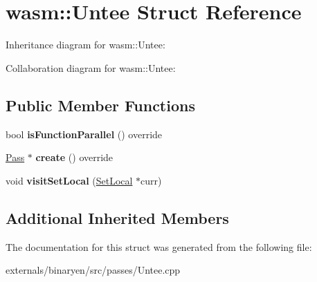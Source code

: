 \hypertarget{structwasm_1_1_untee}{}\section{wasm\+:\+:Untee Struct Reference}
\label{structwasm_1_1_untee}


Inheritance diagram for wasm\+:\+:Untee\+:


Collaboration diagram for wasm\+:\+:Untee\+:
\subsection*{Public Member Functions}
\begin{DoxyCompactItemize}
\item 
\mbox{\label{structwasm_1_1_untee_a543a1c3099eb449c6097090ac2db5d5c}} 
bool {\bfseries is\+Function\+Parallel} () override
\item 
\mbox{\label{structwasm_1_1_untee_ab34619b11a5fff6289cf600784852b22}} 
\mbox{\hyperlink{classwasm_1_1_pass}{Pass}} $\ast$ {\bfseries create} () override
\item 
\mbox{\label{structwasm_1_1_untee_ab2c97bde0d2c24c91bdd49df81b135c1}} 
void {\bfseries visit\+Set\+Local} (\mbox{\hyperlink{classwasm_1_1_set_local}{Set\+Local}} $\ast$curr)
\end{DoxyCompactItemize}
\subsection*{Additional Inherited Members}


The documentation for this struct was generated from the following file\+:\begin{DoxyCompactItemize}
\item 
externals/binaryen/src/passes/Untee.\+cpp\end{DoxyCompactItemize}
